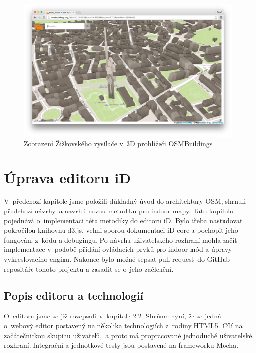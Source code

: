  \begin{figure}
	  \centering
      \includegraphics[width=\textwidth]{img/211-osmb.png}
      \caption{Zobrazení Žižkovského vysílače v~3D prohlížeči OSMBuildings}
      \label{obr211}
  \end{figure}



\chapter{Úprava editoru iD}\label{uxfaprava-editoru-id}

V~předchozí kapitole jsme položili důkladný úvod do architektury OSM, shrnuli předchozí návrhy~a navrhli novou metodiku pro indoor mapy. Tato kapitola pojednává o~implementaci této metodiky do editoru iD. Bylo třeba nastudovat pokročilou knihovnu d3.js, velmi sporou dokumentaci iD-core a pochopit jeho fungování z~kódu a debugingu. Po návrhu uživatelského rozhraní mohla začít implementace v~podobě přidání ovládacích prvků pro indoor mód a úpravy vykreslovacího enginu. Nakonec bylo možné sepsat pull request~do GitHub repositáře tohoto projektu a zasadit se o~jeho začlenění.

\section{Popis editoru a technologií}\label{popis-editoru-a-technologiuxed}

O~editoru jsme se již rozepsali~v~kapitole 2.2. Shrňme nyní, že se jedná o~webový editor postavený na několika technologiích z~rodiny HTML5. Cílí na začátečnickou skupinu uživatelů,~a proto má propracované jednoduché uživatelské rozhraní. Integrační a jednotkové testy jsou postavené na frameworku Mocha.

